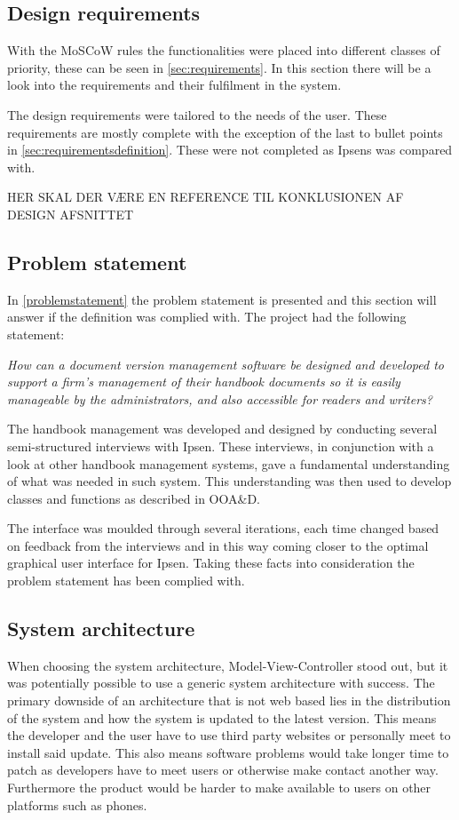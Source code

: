 \subsection{Design requirements}
With the MoSCoW rules the functionalities were placed into different classes of priority, these can be seen in \cref{sec:requirements}. In this section there will be a look into the requirements and their fulfilment in the system.

The design requirements were tailored to the needs of the user. These requirements are mostly complete with the exception of the last to bullet points in \cref{sec:requirementsdefinition}.
These were not completed as Ipsens was compared with.  

HER SKAL DER VÆRE EN REFERENCE TIL KONKLUSIONEN AF DESIGN AFSNITTET

\subsection{Problem statement}
In \cref{problemstatement} the problem statement is presented and this section will answer if the definition was complied with. The project had the following statement:

\begin{center}
\textit{How can a document version management software be designed and developed to support a firm's management of their handbook documents so it is easily manageable by the administrators, and also accessible for readers and writers?}
\end{center}

The handbook management was developed and designed by conducting several semi-structured interviews with Ipsen. These interviews, in conjunction with a look at other handbook management systems, gave a fundamental understanding of what was needed in such system. This understanding was then used to develop classes and functions as described in OOA\&D\cite{Rod-Aalborg}. 

The interface was moulded through several iterations, each time changed based on feedback from the interviews and in this way coming closer to the optimal graphical user interface for Ipsen. Taking these facts into consideration the problem statement has been complied with.

\subsection{System architecture}
When choosing the system architecture, Model-View-Controller stood out, but it was potentially possible to use a generic system architecture with success. The primary downside of an architecture that is not web based lies in the distribution of the system and how the system is updated to the latest version. This means the developer and the user have to use third party websites or personally meet to install said update. This also means software problems would take longer time to patch as developers have to meet users or otherwise make contact another way. Furthermore the product would be harder to make available to users on other platforms such as phones.

